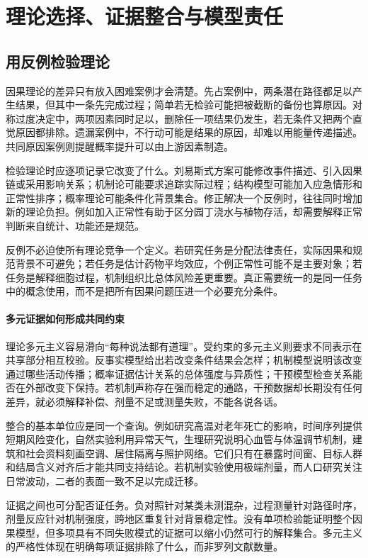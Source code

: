 \section{理论选择、证据整合与模型责任}

\subsection{用反例检验理论}

因果理论的差异只有放入困难案例才会清楚。先占案例中，两条潜在路径都足以产生结果，但其中一条先完成过程；简单若无检验可能把被截断的备份也算原因。对称过度决定中，两项因素同时足以，删除任一项结果仍发生，若无条件又把两个直觉原因都排除。遗漏案例中，不行动可能是结果的原因，却难以用能量传递描述。共同原因案例则提醒概率提升可以由上游因素制造。

检验理论时应逐项记录它改变了什么。刘易斯式方案可能修改事件描述、引入因果链或采用影响关系；机制论可能要求追踪实际过程；结构模型可能加入应急情形和正常性排序；概率理论可能条件化背景集合。修正解决一个反例时，往往同时增加新的理论负担。例如加入正常性有助于区分园丁浇水与植物存活，却需要解释正常判断来自统计、功能还是规范。

反例不必迫使所有理论竞争一个定义。若研究任务是分配法律责任，实际因果和规范背景不可避免；若任务是估计药物平均效应，个例正常性可能不是主要对象；若任务是解释细胞过程，机制组织比总体风险差更重要。真正需要统一的是同一任务中的概念使用，而不是把所有因果问题压进一个必要充分条件。

\paragraph{多元证据如何形成共同约束}

理论多元主义容易滑向“每种说法都有道理”。受约束的多元主义则要求不同表示在共享部分相互校验。反事实模型给出若改变条件结果会怎样；机制模型说明该改变通过哪些活动传播；概率证据估计关系的总体强度与异质性；干预模型检查关系能否在外部改变下保持。若机制声称存在强而稳定的通路，干预数据却长期没有任何差异，就必须解释补偿、剂量不足或测量失败，不能各说各话。

整合的基本单位应是同一个查询。例如研究高温对老年死亡的影响，时间序列提供短期风险变化，自然实验利用异常天气，生理研究说明心血管与体温调节机制，建筑和社会资料刻画空调、居住隔离与照护网络。它们只有在暴露时间窗、目标人群和结局含义对齐后才能共同支持结论。若机制实验使用极端剂量，而人口研究关注日常波动，二者的表面一致不足以完成迁移。

证据之间也可分配否证任务。负对照针对某类未测混杂，过程测量针对路径时序，剂量反应针对机制强度，跨地区重复针对背景稳定性。没有单项检验能证明整个因果模型，但多项具有不同失败模式的证据可以缩小仍然可行的解释集合。多元主义的严格性体现在明确每项证据排除了什么，而非罗列文献数量。

